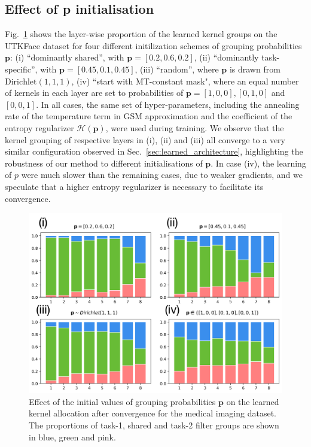 \subsection{Effect of \textbf{p} initialisation}
Fig.~\ref{fig:sensitivity_to_initialp} shows the layer-wise proportion of the learned kernel groups on the UTKFace dataset for four different initilization schemes of grouping probabilities $\mathbf{p}$: (i) ``dominantly shared'', with $\mathbf{p}=[0.2, 0.6, 0.2]$, (ii) ``dominantly task-specific'', with $\mathbf{p}=[0.45, 0.1, 0.45]$, (iii) ``random'', where $\mathbf{p}$ is drawn from $\text{Dirichlet}(1,1,1)$, (iv) ``start with MT-constant mask", where an equal number of kernels in each layer are set to probabilities of $\mathbf{p}= [1,0,0],[0,1,0]$ and $[0,0,1]$. In all cases, the same set of hyper-parameters, including the annealing rate of the temperature term in GSM approximation and the coefficient of the entropy regularizer $\mathcal{H}(\mathbf{p})$, were used during training. We observe that the kernel grouping of respective layers in (i), (ii) and (iii) all converge to a very similar configuration observed in Sec.~\ref{sec:learned_architecture}, highlighting the robustness of our method to different initialisations of $\mathbf{p}$. In case (iv), the learning of $p$ were much slower than the remaining cases, due to weaker gradients, and we speculate that a higher entropy regularizer is necessary to facilitate its convergence. 


\begin{figure}[t!]
	\center
	\includegraphics[width= 0.75\linewidth]{chapter_6/figures/DIFFERENT_P.pdf}
	\caption{\footnotesize Effect of the initial values of grouping probabilities $\mathbf{p}$ on the learned kernel allocation after convergence for the medical imaging dataset. The proportions of task-1, shared and task-2 filter groups are shown in blue, green and pink. }
    \label{fig:sensitivity_to_initialp}
\end{figure}




